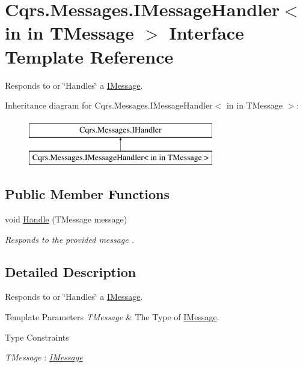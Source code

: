 \hypertarget{interfaceCqrs_1_1Messages_1_1IMessageHandler}{}\section{Cqrs.\+Messages.\+I\+Message\+Handler$<$ in in T\+Message $>$ Interface Template Reference}
\label{interfaceCqrs_1_1Messages_1_1IMessageHandler}


Responds to or \char`\"{}\+Handles\char`\"{} a \hyperlink{interfaceCqrs_1_1Messages_1_1IMessage}{I\+Message}.  


Inheritance diagram for Cqrs.\+Messages.\+I\+Message\+Handler$<$ in in T\+Message $>$\+:\begin{figure}[H]
\begin{center}
\leavevmode
\includegraphics[height=2.000000cm]{interfaceCqrs_1_1Messages_1_1IMessageHandler}
\end{center}
\end{figure}
\subsection*{Public Member Functions}
\begin{DoxyCompactItemize}
\item 
void \hyperlink{interfaceCqrs_1_1Messages_1_1IMessageHandler_a4d68d2c919afce06ce893caabd73f424_a4d68d2c919afce06ce893caabd73f424}{Handle} (T\+Message message)
\begin{DoxyCompactList}\small\item\em Responds to the provided {\itshape message} . \end{DoxyCompactList}\end{DoxyCompactItemize}


\subsection{Detailed Description}
Responds to or \char`\"{}\+Handles\char`\"{} a \hyperlink{interfaceCqrs_1_1Messages_1_1IMessage}{I\+Message}. 


\begin{DoxyTemplParams}{Template Parameters}
{\em T\+Message} & The Type of \hyperlink{interfaceCqrs_1_1Messages_1_1IMessage}{I\+Message}.\\
\hline
\end{DoxyTemplParams}
\begin{Desc}
\item[Type Constraints]\begin{description}
\item[{\em T\+Message} : {\em \hyperlink{interfaceCqrs_1_1Messages_1_1IMessage}{I\+Message}}]\end{description}
\end{Desc}


